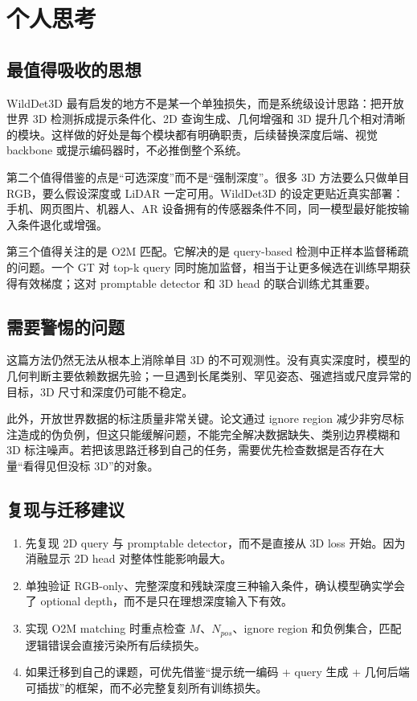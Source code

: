 \section{个人思考}

\subsection{最值得吸收的思想}

WildDet3D 最有启发的地方不是某一个单独损失，而是系统级设计思路：把开放世界 3D 检测拆成提示条件化、2D 查询生成、几何增强和 3D 提升几个相对清晰的模块。这样做的好处是每个模块都有明确职责，后续替换深度后端、视觉 backbone 或提示编码器时，不必推倒整个系统。

第二个值得借鉴的点是“可选深度”而不是“强制深度”。很多 3D 方法要么只做单目 RGB，要么假设深度或 LiDAR 一定可用。WildDet3D 的设定更贴近真实部署：手机、网页图片、机器人、AR 设备拥有的传感器条件不同，同一模型最好能按输入条件退化或增强。

第三个值得关注的是 O2M 匹配。它解决的是 query-based 检测中正样本监督稀疏的问题。一个 GT 对 top-k query 同时施加监督，相当于让更多候选在训练早期获得有效梯度；这对 promptable detector 和 3D head 的联合训练尤其重要。

\subsection{需要警惕的问题}

这篇方法仍然无法从根本上消除单目 3D 的不可观测性。没有真实深度时，模型的几何判断主要依赖数据先验；一旦遇到长尾类别、罕见姿态、强遮挡或尺度异常的目标，3D 尺寸和深度仍可能不稳定。

此外，开放世界数据的标注质量非常关键。论文通过 ignore region 减少非穷尽标注造成的伪负例，但这只能缓解问题，不能完全解决数据缺失、类别边界模糊和 3D 标注噪声。若把该思路迁移到自己的任务，需要优先检查数据是否存在大量“看得见但没标 3D”的对象。

\subsection{复现与迁移建议}

\begin{enumerate}
    \item 先复现 2D query 与 promptable detector，而不是直接从 3D loss 开始。因为消融显示 2D head 对整体性能影响最大。
    \item 单独验证 RGB-only、完整深度和残缺深度三种输入条件，确认模型确实学会了 optional depth，而不是只在理想深度输入下有效。
    \item 实现 O2M matching 时重点检查 $M$、$N_{pos}$、ignore region 和负例集合，匹配逻辑错误会直接污染所有后续损失。
    \item 如果迁移到自己的课题，可优先借鉴“提示统一编码 + query 生成 + 几何后端可插拔”的框架，而不必完整复刻所有训练损失。
\end{enumerate}
